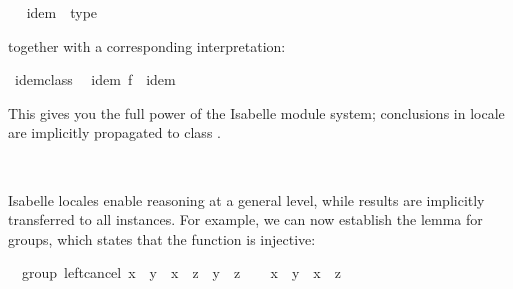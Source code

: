 \begin{isabellebody}
\ %
\isadeliminvisible
%
\endisadeliminvisible
%
\isataginvisible
%
\endisataginvisible
{\isafoldinvisible}%
%
\isadeliminvisible
%
\endisadeliminvisible
%
\isadelimquote
%
\endisadelimquote
%
\isatagquote
{}\isamarkupfalse%
\ idem\ {\isacharless}\ type%
\endisatagquote
{\isafoldquote}%
%
\isadelimquote
%
\endisadelimquote
%
\isadeliminvisible
%
\endisadeliminvisible
%
\isataginvisible
%
\endisataginvisible
{\isafoldinvisible}%
%
\isadeliminvisible
%
\endisadeliminvisible
%
\begin{isamarkuptext}%
\noindent together with a corresponding interpretation:%
\end{isamarkuptext}%
\isamarkuptrue%
%
\isadelimquote
%
\endisadelimquote
%
\isatagquote
{}\isamarkupfalse%
\ idem{\isacharunderscore}class{\isacharcolon}\isanewline
\ \ idem\ {\isachardoublequoteopen}f\ {\isasymColon}\ {\isacharparenleft}{\isasymalpha}{\isasymColon}idem{\isacharparenright}\ {\isasymRightarrow}\ {\isasymalpha}{\isachardoublequoteclose}%
\endisatagquote
{\isafoldquote}%
%
\isadelimquote
%
\endisadelimquote
%
\begin{isamarkuptext}%
\noindent This gives you the full power of the Isabelle module system;
  conclusions in locale  are implicitly propagated
  to class .%
\end{isamarkuptext}%
\isamarkuptrue%
\ %
\isadeliminvisible
%
\endisadeliminvisible
%
\isataginvisible
%
\endisataginvisible
{\isafoldinvisible}%
%
\isadeliminvisible
%
\endisadeliminvisible
%
\isamarkuptrue%
%
\begin{isamarkuptext}%
Isabelle locales enable reasoning at a general level, while results
  are implicitly transferred to all instances.  For example, we can
  now establish the  lemma for groups, which
  states that the function  is injective:%
\end{isamarkuptext}%
\isamarkuptrue%
%
\isadelimquote
%
\endisadelimquote
%
\isatagquote
{}\isamarkupfalse%
\ {\isacharparenleft}\ group{\isacharparenright}\ left{\isacharunderscore}cancel{\isacharcolon}\ {\isachardoublequoteopen}x\ {\isasymotimes}\ y\ {\isacharequal}\ x\ {\isasymotimes}\ z\ {\isasymlongleftrightarrow}\ y\ {\isacharequal}\ z{\isachardoublequoteclose}\isanewline
{}\isamarkupfalse%
\isanewline
\ \ \isamarkupfalse%
\ {\isachardoublequoteopen}x\ {\isasymotimes}\ y\ {\isacharequal}\ x\ {\isasymotimes}\ z{\isachardoublequoteclose}\isanewline

\end{isabellebody}
